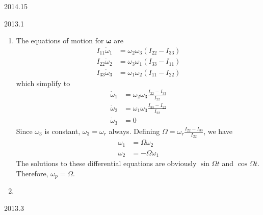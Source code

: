 \documentclass[12pt]{article}
\begin{document}
\begin{solution}{2014.15}

\end{solution}


\begin{solution}{2013.1}
  \begin{enumerate}
    \item The equations of motion for $\boldsymbol{\omega}$ are
    \begin{align*}
      I_{11} \dot{\omega}_1 & = \omega_2 \omega_3 (I_{22} - I_{33}) \\
      I_{22} \dot{\omega}_2 & = \omega_3 \omega_1 (I_{33} - I_{11}) \\
      I_{33} \dot{\omega}_3 & = \omega_1 \omega_2 (I_{11} - I_{22})
    \end{align*}
    which simplify to
    \begin{align*}
      \dot{\omega}_1 & = \omega_2 \omega_3 \frac{I_{22} - I_{33}}{I_{22}} \\
      \dot{\omega}_2 & = \omega_1 \omega_3 \frac{I_{33} - I_{22}}{I_{22}} \\
      \dot{\omega}_3 & = 0
    \end{align*}
    Since $\omega_3$ is constant, $\omega_3 = \omega_r$ always.
    Defining $\Omega = \omega_r \frac{I_{22} - I_{33}}{I_{22}}$, we have
    \begin{align*}
      \dot{\omega}_1 & = \Omega \omega_2 \\
      \dot{\omega}_2 & = -\Omega \omega_1
    \end{align*}
    The solutions to these differential equations are obviously $\sin \Omega t$ and $\cos \Omega t$.
    Therefore, $\omega_p = \Omega$.

    \item

  \end{enumerate}
\end{solution}


\begin{solution}{2013.3}

\end{solution}
\end{document}
